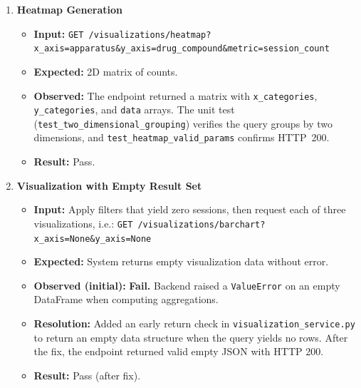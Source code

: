 \documentclass[12pt, titlepage]{article}
\begin{document}
\begin{enumerate}[label=\textbf{FR5-T\arabic*:}, leftmargin=*, labelsep=1em]
  \item \textbf{Heatmap Generation}
  \begin{itemize}
    \item \textbf{Input:} \texttt{GET /visualizations/\allowbreak{}heatmap?x\_\allowbreak{}axis=apparatus\&y\_\allowbreak{}axis=drug\_\allowbreak{}compound\&metric=session\_\allowbreak{}count}
    \item \textbf{Expected:} 2D matrix of counts.
    \item \textbf{Observed:} The endpoint returned a matrix with \texttt{x\_\allowbreak{}categories},
      \texttt{y\_\allowbreak{}categories}, and \texttt{data} arrays.
      The unit test (\texttt{test\_\allowbreak{}two\_\allowbreak{}dimensional\_\allowbreak{}grouping}) verifies the query groups by two
      dimensions, and \texttt{test\_\allowbreak{}heatmap\_\allowbreak{}valid\_\allowbreak{}params} confirms HTTP~200.
    \item \textbf{Result:} Pass.
  \end{itemize}

  \item \textbf{Visualization with Empty Result Set}
  \begin{itemize}
    \item \textbf{Input:} Apply filters that yield zero sessions, then request each of three visualizations, i.e.: \texttt{GET /visualizations/\allowbreak{}barchart?x\_\allowbreak{}axis=None\&y\_\allowbreak{}axis=None}
    \item \textbf{Expected:} System returns empty visualization data without error.
    \item \textbf{Observed (initial):} \textbf{Fail.} Backend raised a \texttt{ValueError} on an empty DataFrame when computing aggregations.
    \item \textbf{Resolution:} Added an early return check in \texttt{visualization\_service.py} to return an empty data structure when the query yields no rows. After the fix, the endpoint returned valid empty JSON with HTTP 200.
    \item \textbf{Result:} Pass (after fix).
  \end{itemize}


\end{enumerate}
\end{document}
